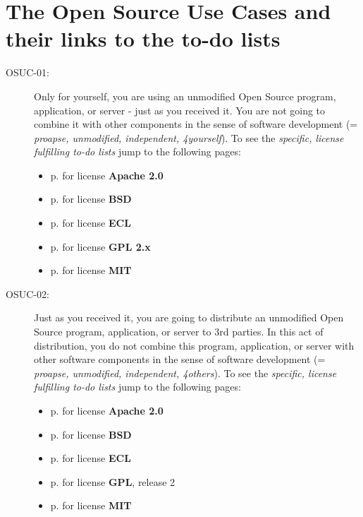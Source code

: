 \section{The Open Source Use Cases and their links to the to-do lists}

\begin{description}

\item[OSUC-01:]\label{OSUC-01-DEF}
Only for yourself, you are using an unmodified Open Source program, application,
or server - just as you received it. You are not going to combine it with other
components in the sense of software development (= \textit{proapse, unmodified,
independent, 4yourself}). 
To see the \textit{specific, license fulfilling to-do lists} jump to the
following pages:
  \begin{itemize}
    \item p. \pageref{OSUC-01-Apache20} for license \textbf{Apache 2.0}
    \item p. \pageref{OSUC-01-BSD} for license \textbf{BSD}
    \item p. \pageref{OSUC-01-ECL} for license \textbf{ECL}
    \item p. \pageref{OSUC-01-GPL2X} for license \textbf{GPL 2.x}
    \item p. \pageref{OSUC-01-MIT} for license \textbf{MIT}
  \end{itemize}

\item[OSUC-02:]\label{OSUC-02-DEF} Just as you received it, you are going to
distribute an unmodified Open Source program, application, or server to 3rd
parties. In this act of distribution, you do not combine this program,
application, or server with other software components in the sense of software
development (= \textit{proapse, unmodified, independent, 4others}). 
To see the \textit{specific, license fulfilling to-do lists} jump to the
following pages:
  \begin{itemize}
    \item p. \pageref{OSUC-02-Apache20} for license \textbf{Apache 2.0}
    \item p. \pageref{OSUC-02-BSD} for license \textbf{BSD}
    \item p. \pageref{OSUC-02-ECL} for license \textbf{ECL}
    \item p. \pageref{OSUC-02-GPL2X} for license \textbf{GPL}, release 2
    \item p. \pageref{OSUC-02-MIT} for license \textbf{MIT}
  \end{itemize}


\end{description}
